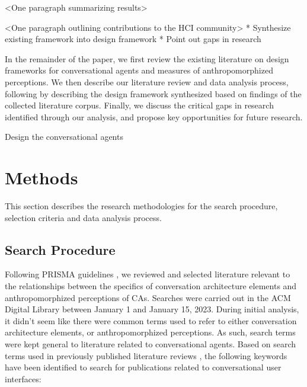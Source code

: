 \documentclass[sigconf,screen,review, anonymous]{acmart}
\begin{document}
<One paragraph summarizing results>

<One paragraph outlining contributions to the HCI community>
* Synthesize existing framework into design framework \newline
* Point out gaps in research \newline

In the remainder of the paper, we first review the existing literature on design frameworks for conversational agents and measures of anthropomorphized perceptions. We then describe our literature review and data analysis process, following by describing the design framework synthesized based on findings of the collected literature corpus. Finally, we discuss the critical gaps in research identified through our analysis, and propose key opportunities for future research.


Design the conversational agents








\section{Methods}

This section describes the research methodologies for the search procedure, selection criteria and data analysis process.

\subsection{Search Procedure}

Following PRISMA guidelines \cite{prisma}, we reviewed and selected literature relevant to the relationships between the specifics of conversation architecture elements and anthropomorphized perceptions of CAs. Searches were carried out in the ACM Digital Library between January 1 and January 15, 2023. During initial analysis, it didn't seem like there were common terms used to refer to either conversation architecture elements, or anthropomorphized perceptions. As such, search terms were kept general to literature related to conversational agents. Based on search terms used in previously published literature reviews \cite{clark2019state}\cite{rapp2021human} , the following keywords have been identified to search for publications related to conversational user interfaces:
\newline
\end{document}
